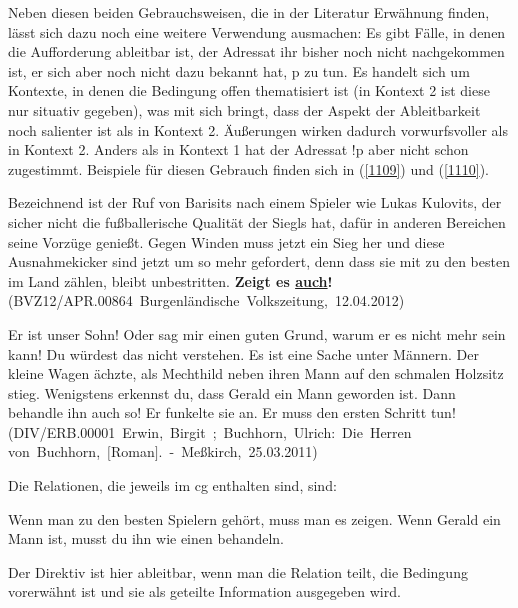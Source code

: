 {Neben diesen beiden Gebrauchsweisen, die in der Literatur Erwähnung finden, lässt sich dazu noch eine weitere Verwendung ausmachen: Es gibt Fälle, in denen die Aufforderung ableitbar ist, der Adressat ihr bisher noch nicht nachgekommen ist, er sich aber noch nicht dazu bekannt hat, p zu tun. Es handelt sich um Kontexte, in denen die Bedingung offen thematisiert ist (in Kontext 2 ist diese nur situativ gegeben), was mit sich bringt, dass der Aspekt der Ableitbarkeit noch salienter ist als in Kontext 2. Äußerungen wirken dadurch vorwurfsvoller als in Kontext 2. Anders als in Kontext 1 hat der Adressat !p aber nicht schon zuge\-stimmt. Beispiele für diesen Gebrauch finden sich in (\ref{1109}) und (\ref{1110}).

\begin{exe}
	\ex\label{1109} 
	\scriptsize
 	Bezeichnend ist der Ruf von Barisits nach einem Spieler wie Lukas Kulovits, der sicher nicht die fußballerische Qualität der Siegls hat, dafür in 			anderen Bereichen seine Vorzüge genießt. Gegen Winden muss jetzt ein Sieg her und diese Ausnahmekicker sind jetzt um so mehr gefordert, denn dass sie 		mit zu den besten im Land zählen, bleibt unbestritten. \textbf{Zeigt es \underline{auch}!}	
	\newline
	\hbox{}\hfill\hbox{(BVZ12/APR.00864 Burgenländische Volkszeitung, 12.04.2012)}
\end{exe}	

\begin{exe}
	\ex\label{1110} 
	\scriptsize
 	\glqq Er ist unser Sohn! Oder sag mir einen guten Grund, warum er es nicht mehr sein kann!\grqq{} \glqq Du würdest das nicht verstehen. Es ist eine 		Sache unter Männern.\grqq{} Der kleine Wagen ächzte, als Mechthild neben ihren Mann auf den schmalen Holzsitz stieg. \glqq Wenigstens erkennst du, dass 	Gerald ein Mann geworden ist. Dann behandle ihn auch so!\grqq{} Er funkelte sie an. \glqq Er muss den ersten Schritt tun!\grqq{}	
	\newline
	\hbox{}\hfill\hbox{(DIV/ERB.00001 Erwin, Birgit ; Buchhorn, Ulrich: Die Herren}
	\newline
	\hbox{}\hfill\hbox{von Buchhorn, $[$Roman$]$. - Meßkirch, 25.03.2011)}
\end{exe}
Die Relationen, die jeweils im cg enthalten sind, sind:

\begin{exe}
	\ex\label{1111} 
		\begin{xlist}	
			\ex\label{1111a} Wenn man zu den besten Spielern gehört, muss man es zeigen.
			\ex\label{1111b} Wenn Gerald ein Mann ist, musst du ihn wie einen behandeln.
		\end{xlist}
\end{exe}	
Der Direktiv ist hier ableitbar, wenn man die Relation teilt, die Bedingung vorerwähnt ist und sie als geteilte Information ausgegeben wird.

}
